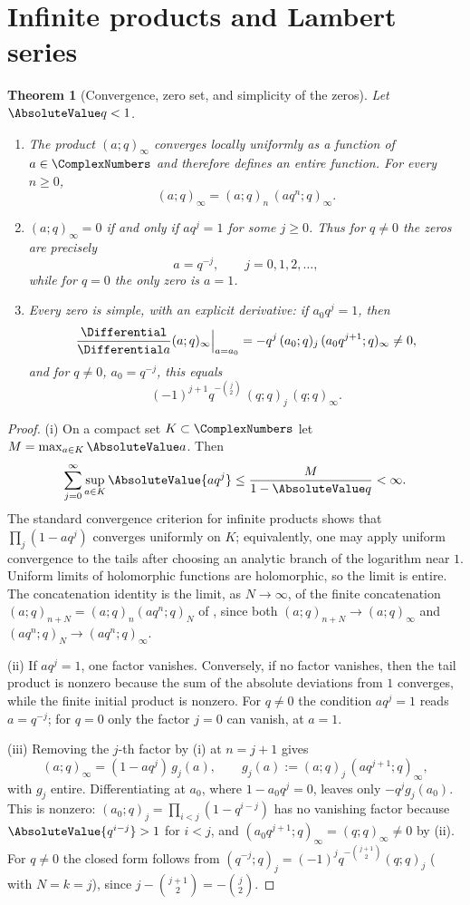 \documentclass[11pt,a4paper,oneside,openany]{book}
\newtheorem{theorem}{Theorem}[chapter]
\theoremstyle{definition}
\theoremstyle{remark}
\begin{document}
\section{Infinite products and Lambert series}

\begin{theorem}[Convergence, zero set, and simplicity of the zeros]\label{thm:poch-entire}
Let $\AbsoluteValue q<1$.
\begin{enumerate}[label=\textup{(\roman*)}]
\item The product $(a;q)_\infty$ converges locally uniformly as a function of $a\in\ComplexNumbers$ and therefore defines an entire function.  For every $n\ge0$,
\[
 (a;q)_\infty=(a;q)_n\,(aq^n;q)_\infty .
\]
\item $(a;q)_\infty=0$ if and only if $aq^j=1$ for some $j\ge0$.  Thus for $q\ne0$ the zeros are precisely
\[
 a=q^{-j},\qquad j=0,1,2,\ldots,
\]
while for $q=0$ the only zero is $a=1$.
\item Every zero is simple, with an explicit derivative: if $a_0q^j=1$, then
\[
 \frac{\Differential}{\Differential a}(a;q)_\infty\Big|_{a=a_0}
 =-q^{j}\,(a_0;q)_j\,(a_0q^{j+1};q)_\infty\ne0,
\]
and for $q\ne0$, $a_0=q^{-j}$, this equals
\[
 (-1)^{j+1}q^{-\binom j2}\,(q;q)_j\,(q;q)_\infty .
\]
\end{enumerate}
\end{theorem}

\begin{proof}
(i) On a compact set $K\subset\ComplexNumbers$ let $M=\max_{a\in K}\AbsoluteValue a$.  Then
\[
 \sum_{j=0}^{\infty}\sup_{a\in K}\AbsoluteValue{a q^j}
 \le \frac{M}{1-\AbsoluteValue q}<\infty.
\]
The standard convergence criterion for infinite products shows that
\(
 \prod_j(1-aq^j)
\)
converges uniformly on $K$; equivalently, one may apply uniform convergence to the tails after choosing an analytic branch of the logarithm near $1$.  Uniform limits of holomorphic functions are holomorphic, so the limit is entire.  The concatenation identity is the limit, as $N\to\infty$, of the finite concatenation $(a;q)_{n+N}=(a;q)_n(aq^n;q)_N$ of , since both $(a;q)_{n+N}\to(a;q)_\infty$ and $(aq^n;q)_N\to(aq^n;q)_\infty$.

(ii) If $aq^j=1$, one factor vanishes.  Conversely, if no factor vanishes, then the tail product is nonzero because the sum of the absolute deviations from $1$ converges, while the finite initial product is nonzero.  For $q\ne0$ the condition $aq^j=1$ reads $a=q^{-j}$; for $q=0$ only the factor $j=0$ can vanish, at $a=1$.

(iii) Removing the $j$-th factor by (i) at $n=j+1$ gives
\[
 (a;q)_\infty=(1-aq^j)\,g_j(a),
 \qquad g_j(a):=(a;q)_j\,(aq^{j+1};q)_\infty ,
\]
with $g_j$ entire.  Differentiating at $a_0$, where $1-a_0q^j=0$, leaves only $-q^j g_j(a_0)$.  This is nonzero: $(a_0;q)_j=\prod_{i<j}(1-q^{i-j})$ has no vanishing factor because $\AbsoluteValue{q^{i-j}}>1$ for $i<j$, and $(a_0q^{j+1};q)_\infty=(q;q)_\infty\ne0$ by (ii).  For $q\ne0$ the closed form follows from $(q^{-j};q)_j=(-1)^jq^{-\binom{j+1}2}(q;q)_j$ ( with $N=k=j$), since $j-\binom{j+1}2=-\binom j2$.
\end{proof}
\end{document}
